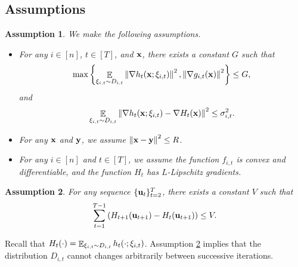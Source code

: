 \documentclass{article}
\newtheorem{Assumption}{\bf{Assumption}}
\begin{document}
\subsection{Assumptions}
\begin{Assumption}
\label{assumption_bounded_gradient_domain}
We make the following assumptions.
\begin{itemize}
\item For any $i\in[n]$, $t\in[T]$, and ${\bf x}$, there exists a constant $G$ such that
\begin{align}
\nonumber
\max\left\{ \mathop{\mathbb{E}}_{ \xi_{i,t} \sim D_{i,t} }\left\lVert\nabla h_t({\bf x};\xi_{i,t})\right\rVert^2,  \left\lVert\nabla g_{i,t}({\bf x})\right\rVert^2 \right\} \le G,
\end{align} and 
\begin{align}
\nonumber
\mathop{\mathbb{E}}_{ \xi_{i,t} \sim D_{i,t} } \left\lVert\nabla h_t({\bf x}; \xi_{i,t}) - \nabla H_t({\bf x})\right\rVert^2 \le \sigma_{i,t}^2.
\end{align}
\item For any ${\bf x}$ and ${\bf y}$, we assume $\left\lVert{\bf x}-{\bf y}\right\rVert^2 \le R$.
\item For any $i\in[n]$ and $t\in[T]$, we assume the function $f_{i,t}$ is convex and differentiable, and the function $H_t$ has  $L$-Lipschitz gradients.
\end{itemize}
\end{Assumption}

\begin{Assumption}
\label{assumption_difference_bound_distributions}
For any sequence $\{{\bf u}_t\}_{t=2}^{T}$, there exists a constant $V$ such that
\begin{align}
\nonumber
\sum_{t=1}^{T-1} \left(  H_{t+1}({\bf u}_{t+1}) - H_t({\bf u}_{t+1})  \right) \le V.
\end{align}
\end{Assumption}

Recall that  $ H_t(\cdot) = \mathop{\mathbb{E}}_{\xi_{i,t} \sim D_{i,t}} h_t(\cdot; \xi_{i,t})$.
Assumption \ref{assumption_difference_bound_distributions} implies that the  distribution $D_{i,t}$ cannot changes arbitrarily between successive iterations.  
\end{document}
